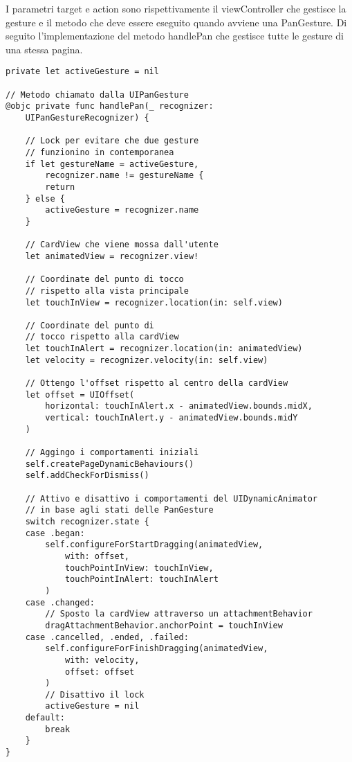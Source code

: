 I parametri target e action sono rispettivamente il viewController che gestisce la gesture e il metodo
che deve essere eseguito quando avviene una PanGesture.
Di seguito l'implementazione del metodo handlePan che gestisce tutte le gesture di una stessa pagina.

\begin{verbatim}
private let activeGesture = nil

// Metodo chiamato dalla UIPanGesture
@objc private func handlePan(_ recognizer:
    UIPanGestureRecognizer) {

    // Lock per evitare che due gesture
    // funzionino in contemporanea
    if let gestureName = activeGesture,
        recognizer.name != gestureName {
        return
    } else {
        activeGesture = recognizer.name
    }
    
    // CardView che viene mossa dall'utente
    let animatedView = recognizer.view!
    
    // Coordinate del punto di tocco
    // rispetto alla vista principale
    let touchInView = recognizer.location(in: self.view)

    // Coordinate del punto di
    // tocco rispetto alla cardView
    let touchInAlert = recognizer.location(in: animatedView)
    let velocity = recognizer.velocity(in: self.view)
    
    // Ottengo l'offset rispetto al centro della cardView
    let offset = UIOffset(
        horizontal: touchInAlert.x - animatedView.bounds.midX,
        vertical: touchInAlert.y - animatedView.bounds.midY
    )

    // Aggingo i comportamenti iniziali
    self.createPageDynamicBehaviours()
    self.addCheckForDismiss()
    
    // Attivo e disattivo i comportamenti del UIDynamicAnimator
    // in base agli stati delle PanGesture
    switch recognizer.state {
    case .began:
        self.configureForStartDragging(animatedView,
            with: offset,
            touchPointInView: touchInView,
            touchPointInAlert: touchInAlert
        )
    case .changed:
        // Sposto la cardView attraverso un attachmentBehavior
        dragAttachmentBehavior.anchorPoint = touchInView
    case .cancelled, .ended, .failed:
        self.configureForFinishDragging(animatedView,
            with: velocity,
            offset: offset
        )
        // Disattivo il lock
        activeGesture = nil
    default:
        break
    }
}
\end{verbatim}

